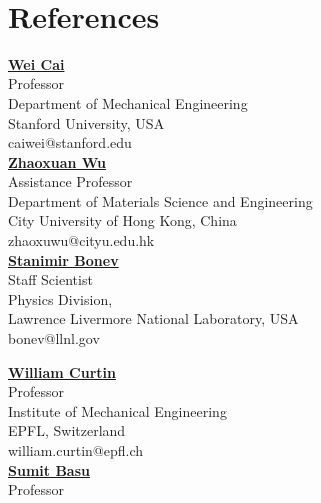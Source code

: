\documentclass[margin,line]{resume}
\begin{document}
\begin{resume}
    ­%

    \section{\mysidestyle References}
    \begin{minipage}[t]{0.5\textwidth}
        \href{https://web.stanford.edu/~caiwei/}{\textbf{\textsf{Wei Cai}}}\\
        Professor\\
        Department of Mechanical Engineering\\
        Stanford University, USA \\
        caiwei@stanford.edu\\[1em]
        \href{https://scholars.cityu.edu.hk/en/persons/zhaoxuan-wu(32022051-be5f-44e8-84eb-794d8f78d35c).html}{\textbf{\textsf{Zhaoxuan Wu}}}\\
        Assistance Professor\\
        Department of Materials Science and Engineering\\
        City University of Hong Kong, China\\
        zhaoxuwu@cityu.edu.hk\\[1em]
        \href{https://qsg.llnl.gov/Site/StanimirBonev.html}{\textbf{\textsf{Stanimir Bonev}}}\\
        Staff Scientist\\
        Physics Division,\\
        Lawrence Livermore National Laboratory, USA\\
        bonev@llnl.gov\\[1em]
    \end{minipage}
    \begin{minipage}[t]{0.5\textwidth}
        \href{https://people.epfl.ch//william.curtin?lang=en}{\textbf{\textsf{William Curtin}}}\\
        Professor\\
        Institute of Mechanical Engineering\\
        EPFL, Switzerland\\
        william.curtin@epfl.ch\\[1em]
        \href{http://home.iitk.ac.in/~sbasu/}{\textbf{\textsf{Sumit Basu}}}\\
        Professor\\

\end{minipage}
\end{resume}
\end{document}
